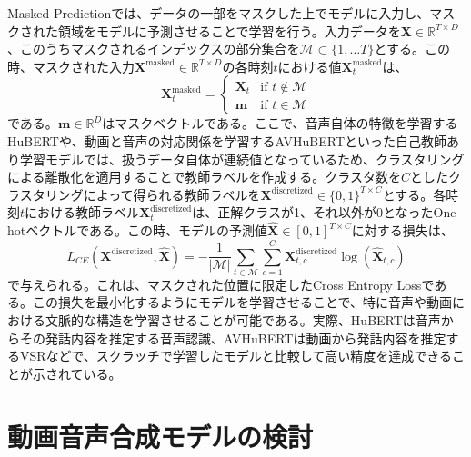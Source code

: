\documentclass[12pt]{jarticle}
\numberwithin{equation}{section}    %
\numberwithin{figure}{section}      %
\numberwithin{table}{section}      %
\begin{document}
Masked Predictionでは、データの一部をマスクした上でモデルに入力し、マスクされた領域をモデルに予測させることで学習を行う。入力データを$\bm{X} \in \mathbb{R}^{T \times D}$、このうちマスクされるインデックスの部分集合を$\mathcal{M} \subset \{ 1, \ldots T \}$とする。この時、マスクされた入力$\bm{X}^{\text{masked}} \in \mathbb{R}^{T \times D}$の各時刻$t$における値$\bm{X}^{\text{masked}}_{t}$は、
\begin{equation}
    \bm{X}^{\text{masked}}_{t} =
    \begin{cases}
        \bm{X}_{t} & \text{if $t \notin \mathcal{M}$} \\
        \bm{m}     & \text{if $t \in \mathcal{M}$}
    \end{cases}
\end{equation}
である。$\bm{m} \in \mathbb{R}^{D}$はマスクベクトルである。ここで、音声自体の特徴を学習するHuBERT\cite{hsu2021hubert}や、動画と音声の対応関係を学習するAVHuBERT\cite{shi2022learning}といった自己教師あり学習モデルでは、扱うデータ自体が連続値となっているため、クラスタリングによる離散化を適用することで教師ラベルを作成する。クラスタ数を$C$としたクラスタリングによって得られる教師ラベルを$\bm{X}^{\text{discretized}} \in \{0, 1\}^{T \times C}$とする。各時刻$t$における教師ラベル$\bm{X}^{\text{discretized}}_{t}$は、正解クラスが1、それ以外が0となったOne-hotベクトルである。この時、モデルの予測値$\hat{\bm{X}} \in [0, 1]^{T \times C}$に対する損失は、
\begin{equation}
    L_{CE}(\bm{X}^{\text{discretized}}, \hat{\bm{X}}) =
    - \frac{1}{|\mathcal{M}|} \sum_{t \in \mathcal{M}} \sum_{c = 1}^{C} \bm{X}^{\text{discretized}}_{t, c} \log (\hat{\bm{X}}_{t, c})
\end{equation}
で与えられる。これは、マスクされた位置に限定したCross Entropy Lossである。この損失を最小化するようにモデルを学習させることで、特に音声や動画における文脈的な構造を学習させることが可能である。実際、HuBERTは音声からその発話内容を推定する音声認識、AVHuBERTは動画から発話内容を推定するVSRなどで、スクラッチで学習したモデルと比較して高い精度を達成できることが示されている。

\clearpage

\section{動画音声合成モデルの検討}
\end{document}
